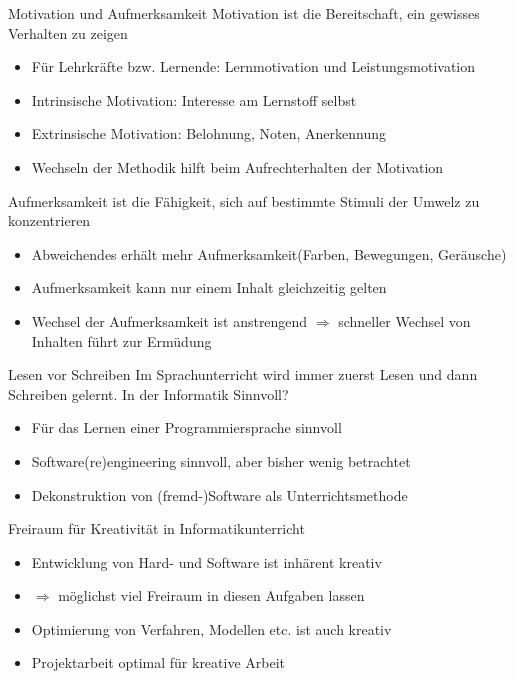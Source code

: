 \documentclass{article}
\begin{document}
\begin{block}{Motivation und Aufmerksamkeit}
    Motivation ist die Bereitschaft, ein gewisses Verhalten zu zeigen
    \begin{itemize}
        \item Für Lehrkräfte bzw. Lernende: Lernmotivation und Leistungsmotivation
        \item Intrinsische Motivation: Interesse am Lernstoff selbst
        \item Extrinsische Motivation: Belohnung, Noten, Anerkennung
        \item Wechseln der Methodik hilft beim Aufrechterhalten der Motivation
    \end{itemize}
    Aufmerksamkeit ist die Fähigkeit, sich auf bestimmte Stimuli der Umwelz zu konzentrieren
    \begin{itemize}
        \item Abweichendes erhält mehr Aufmerksamkeit(Farben, Bewegungen, Geräusche)
        \item Aufmerksamkeit kann nur einem Inhalt gleichzeitig gelten
        \item Wechsel der Aufmerksamkeit ist anstrengend $\Rightarrow$ schneller Wechsel von Inhalten führt zur Ermüdung
    \end{itemize}
\end{block}

\begin{block}{Lesen vor Schreiben}
    Im Sprachunterricht wird immer zuerst Lesen und dann Schreiben gelernt.
    In der Informatik Sinnvoll?
    \begin{itemize}
        \item Für das Lernen einer Programmiersprache sinnvoll
        \item Software(re)engineering sinnvoll, aber bisher wenig betrachtet
        \item Dekonstruktion von (fremd-)Software als Unterrichtsmethode
    \end{itemize}
\end{block}

\begin{block}{Freiraum für Kreativität in Informatikunterricht}
    \begin{itemize}
        \item Entwicklung von Hard- und Software ist inhärent kreativ
        \item $\Rightarrow$ möglichst viel Freiraum in diesen Aufgaben lassen
        \item Optimierung von Verfahren, Modellen etc. ist auch kreativ
        \item Projektarbeit optimal für kreative Arbeit
    \end{itemize}
\end{block}
\end{document}
